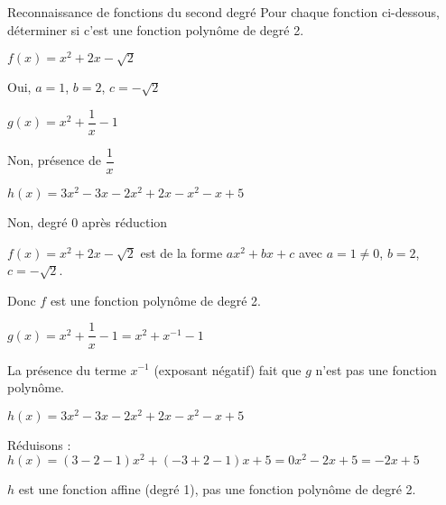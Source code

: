\begin{EXO}{Reconnaissance de fonctions du second degré}{}
 Pour chaque fonction ci-dessous, déterminer si c'est une fonction polynôme de degré 2.
\begin{tcbenumerate}[3]
\tcbitem $f(x) = x^2+2x-\sqrt{2}$

\begin{crep}
Oui, $a=1$, $b=2$, $c=-\sqrt{2}$
\end{crep}

\tcbitem $g(x)= x^2+\dfrac{1}{x} -1$

\begin{crep}
Non, présence de $\dfrac{1}{x}$
\end{crep}

\tcbitem $h(x)=3x^2-3x-2x^2+2x-x^2-x+5$

\begin{crep}
Non, degré 0 après réduction
\end{crep}
\end{tcbenumerate}

\exocorrection

\begin{tcbenumerate}[3]
\tcbitem $f(x) = x^2+2x-\sqrt{2}$ est de la forme $ax^2+bx+c$ avec $a=1 \neq 0$, $b=2$, $c=-\sqrt{2}$.

Donc $f$ est une fonction polynôme de degré 2.

\tcbitem $g(x)= x^2+\dfrac{1}{x} -1 = x^2+x^{-1}-1$

La présence du terme $x^{-1}$ (exposant négatif) fait que $g$ n'est pas une fonction polynôme.

\tcbitem $h(x)=3x^2-3x-2x^2+2x-x^2-x+5$

Réduisons : $h(x) = (3-2-1)x^2 + (-3+2-1)x + 5 = 0x^2 - 2x + 5 = -2x + 5$

$h$ est une fonction affine (degré 1), pas une fonction polynôme de degré 2.
\end{tcbenumerate}
\end{EXO}